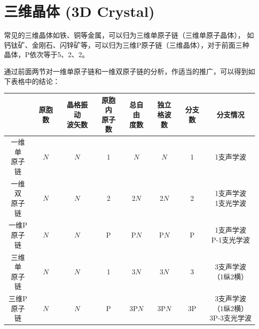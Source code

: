 \documentclass[declarePage]{ecnuthesis}
\begin{document}
\newpage

\section{三维晶体 (3D Crystal)}

常见的三维晶体如铁、铜等金属，可以归为三维单原子链（三维单原子晶体），%
如钙钛矿、金刚石、闪锌矿等，可以归为三维P原子链（三维晶体），对于前面三种晶体，P依次等于5、2、2。

通过前面两节对一维单原子链和一维双原子链的分析，作适当的推广，可以得到如下表格中的结论：
\begin{table}[htb]
    \centering
    \begin{tabular}{|c|c|c|c|c|c|c|c|}
        \hline
         & 原胞数 & \makecell[c]{晶格振动\\[-7pt]波矢数} & \makecell[c]{原胞内\\[-7pt]原子数} & \makecell[c]{总自由\\[-7pt]度数} & \makecell[c]{独立\\[-7pt]格波数} & 分支数 & 分支情况 \\ 
        \hline
        \makecell[c]{一维单\\[-7pt]原子链} & $N$   & $N$           & 1           & $N$       & $N$       & 1      & 1支声学波 \\ 
        \hline
        \makecell[c]{一维双\\[-7pt]原子链} & $N$   & $N$           & 2           & 2$N$      & 2$N$      & 2      & \makecell[c]{1支声学波\\[-7pt]1支光学波} \\ 
        \hline
        \makecell[c]{一维P\\[-7pt]原子链}  & $N$   & $N$           & P           & P$N$      & P$N$      & P      & \makecell[c]{1支声学波\\[-7pt]P-1支光学波} \\ 
        \hline
        \makecell[c]{三维单\\[-7pt]原子链} & $N$   & $N$           & 1           & 3$N$      & 3$N$      & 3      & \makecell[c]{3支声学波\\[-7pt]（1纵2横）} \\  
        \hline
        \makecell[c]{三维P\\[-7pt]原子链}  & $N$   & $N$           & P           & 3P$N$     & 3P$N$     & 3P     & \makecell[c]{3支声学波\\[-7pt]（1纵2横）\\[-7pt]3P-3支光学波} \\ 
        \hline
    \end{tabular}
\end{table}
\end{document}
